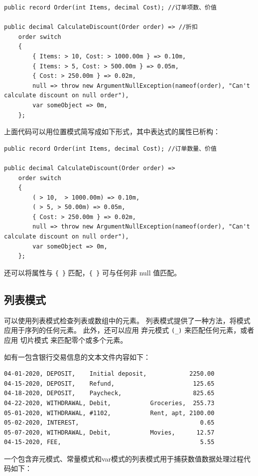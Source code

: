 \begin{lstlisting}
public record Order(int Items, decimal Cost); //订单项数、价值

public decimal CalculateDiscount(Order order) => //折扣
    order switch
    {
        { Items: > 10, Cost: > 1000.00m } => 0.10m,
        { Items: > 5, Cost: > 500.00m } => 0.05m,
        { Cost: > 250.00m } => 0.02m,
        null => throw new ArgumentNullException(nameof(order), "Can't calculate discount on null order"),
        var someObject => 0m,
    };
\end{lstlisting}

上面代码可以用位置模式简写成如下形式，其中表达式的属性已析构：

\begin{lstlisting}
public record Order(int Items, decimal Cost); //订单数量、价值

public decimal CalculateDiscount(Order order) =>
    order switch
    {
        ( > 10,  > 1000.00m) => 0.10m,
        ( > 5, > 50.00m) => 0.05m,
        { Cost: > 250.00m } => 0.02m,
        null => throw new ArgumentNullException(nameof(order), "Can't calculate discount on null order"),
        var someObject => 0m,
    };
\end{lstlisting}

还可以将属性与 \verb|{ }| 匹配，\verb|{ }| 可与任何非 null 值匹配。

\subsection{列表模式}

可以使用列表模式检查列表或数组中的元素。 列表模式提供了一种方法，将模式应用于序列的任何元素。
此外，还可以应用 弃元模式 \verb|(_)| 来匹配任何元素，或者应用 切片模式 来匹配零个或多个元素。

如有一包含银行交易信息的文本文件内容如下：

\begin{verbatim}
04-01-2020, DEPOSIT,    Initial deposit,            2250.00
04-15-2020, DEPOSIT,    Refund,                      125.65
04-18-2020, DEPOSIT,    Paycheck,                    825.65
04-22-2020, WITHDRAWAL, Debit,           Groceries,  255.73
05-01-2020, WITHDRAWAL, #1102,           Rent, apt, 2100.00
05-02-2020, INTEREST,                                  0.65
05-07-2020, WITHDRAWAL, Debit,           Movies,      12.57
04-15-2020, FEE,                                       5.55
\end{verbatim}

一个包含弃元模式、常量模式和var模式的列表模式用于捕获数值数据处理过程代码如下：

